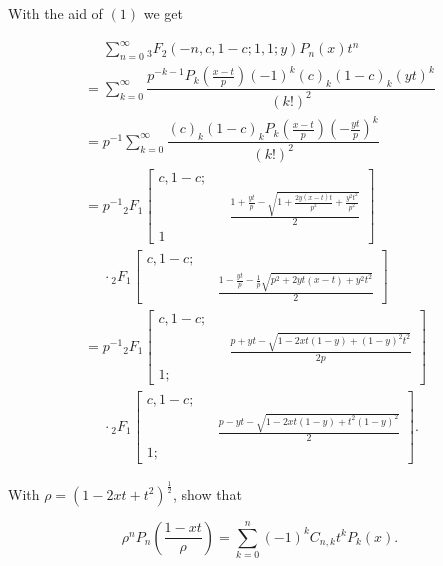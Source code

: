 \begin{solution}
With the aid of $(1)$ we get

$$\begin{array}{ll}
\phantom{=}\displaystyle\sum_{n=0}^{\infty} {}_3F_2(-n,c,1-c;1,1;y)P_n(x)t^n \\
= \displaystyle\sum_{k=0}^{\infty} \dfrac{p^{-k-1} P_k(\frac{x-t}{p}) (-1)^k (c)_k (1-c)_k (yt)^k}{(k!)^2} \\
= p^{-1} \displaystyle\sum_{k=0}^{\infty} \dfrac{(c)_k (1-c)_k P_k(\frac{x-t}{p}) (-\frac{yt}{p})^k}{(k!)^2} \\
= p^{-1} {}_2F_1 \left[ \begin{array}{rlr}
c,1-c; & & \\
& & \frac{1 + \frac{yt}{p} - \sqrt{1 + \frac{2y(x-t)t}{p^2} + \frac{y^2t^2}{p^2}}}{2} \\
1 & &
\end{array} \right] \\
\phantom{=}\cdot {}_2F_1 \left[ \begin{array}{rlr}
c, 1-c; & & \\
& & \frac{1 - \frac{yt}{p} - \frac{1}{p} \sqrt{p^2 + 2yt(x-t)+y^2t^2}}{2}
\end{array} \right] \\
= p^{-1} {}_2F_1 \left[ \begin{array}{rlr}
c, 1-c; & & \\
& & \frac{p + yt - \sqrt{1 - 2xt(1-y)+(1-y)^2t^2}}{2p} \\
1; & &
\end{array} \right] \\
\phantom{=}\cdot {}_2F_1 \left[ \begin{array}{rlr}
c, 1-c; & & \\
& & \frac{p - yt - \sqrt{1 - 2xt(1-y) + t^2(1-y)^2}}{2} \\
1; & &
\end{array} \right].
\end{array}$$

\end{solution}
\begin{problem}\label{problem9chapter10}
With $\rho = (1-2xt+t^2)^{\frac{1}{2}}$, show that

$$\rho^n P_n \left( \dfrac{1-xt}{\rho} \right) = \displaystyle\sum_{k=0}^n (-1)^k C_{n,k} t^k P_k(x).$$
\end{problem}
